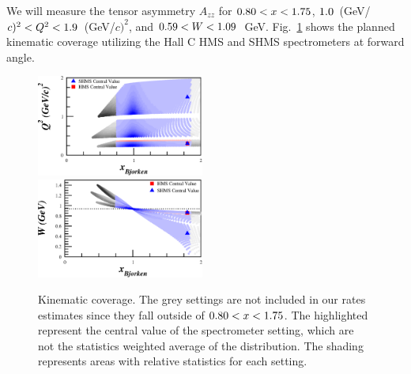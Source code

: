 




\label{EXP}
We will measure the tensor asymmetry $A_{zz}$ for $0.80<x<1.75$, $1.0$~(GeV/$c)^2 < Q^2 <1.9$~(GeV/$c)^2$, and $0.59 < W < 1.09$~GeV. Fig.~\ref{kincov} shows the planned kinematic coverage utilizing the Hall C HMS and SHMS spectrometers at forward angle.

\begin{figure}
\begin{center}
\includegraphics[width=0.49\textwidth]{figs/Pzz_30_all_q2.eps}~~
\includegraphics[width=0.49\textwidth]{figs/Pzz_30_all_w.eps} %

\caption{\label{kincov} Kinematic coverage.  The grey settings are not included in our rates estimates since they fall outside of $0.80 < x < 1.75$. The highlighted represent the central value of the spectrometer setting, which are not the statistics weighted average of the distribution. The shading represents areas with relative statistics for each setting.}
\end{center}
\end{figure}


